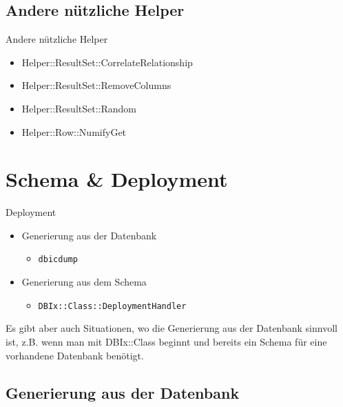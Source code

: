\subsection{Andere nützliche Helper}
\begin{frame}{Andere nützliche Helper}
\begin{itemize}
\item Helper::ResultSet::CorrelateRelationship
\item Helper::ResultSet::RemoveColumns
\item Helper::ResultSet::Random
\item Helper::Row::NumifyGet
\end{itemize}
\end{frame}


\section{Schema \& Deployment}

\begin{frame}[fragile]{Deployment}
\begin{itemize}
\item Generierung aus der Datenbank
\begin{itemize}
\item \verb|dbicdump|
\end{itemize}
\item Generierung aus dem Schema
\begin{itemize}
\item \verb|DBIx::Class::DeploymentHandler|
\end{itemize}
\end{itemize}
\end{frame}

Es gibt aber auch Situationen, wo die
Generierung aus der Datenbank sinnvoll ist,
z.B. wenn man mit DBIx::Class beginnt und
bereits ein Schema für eine vorhandene
Datenbank benötigt.


\subsection{Generierung aus der Datenbank}

